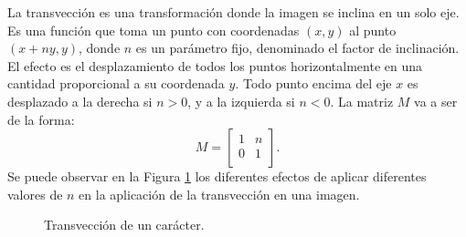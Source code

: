 			La transvección es una transformación donde la imagen se inclina en un solo eje. Es una función que toma un punto con coordenadas $(x,y)$ al punto $(x +ny, y)$, donde $n$ es un parámetro fijo, denominado el factor de inclinación. El efecto es el desplazamiento de todos los puntos ho\-ri\-zon\-tal\-men\-te en una cantidad proporcional a su coordenada $y$. Todo punto encima del eje $x$ es desplazado a la derecha si $n > 0$, y a la izquierda si $n < 0$. La matriz $M$ va a ser de la forma:
			\begin{equation}
				M = 
				\begin{bmatrix}
					1 & n \\
					0 & 1 \\
				\end{bmatrix}.
			\end{equation}
		Se puede observar en la Figura \ref{fig: Transformacion Afin - Transveccion} los diferentes efectos de aplicar diferentes valores de $n$ en la aplicación de la transvección en una imagen.
		\begin{figure}[htbp]
			\centering
			\caption[Transvección de un carácter]{Transvección de un carácter.}
			\label{fig: Transformacion Afin - Transveccion}
		\end{figure}	
		
